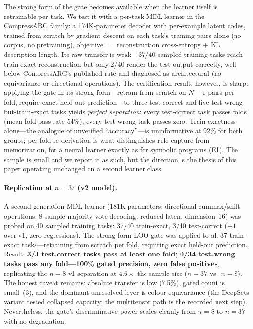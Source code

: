 \documentclass[11pt]{article}
\begin{document}
The strong form of the gate becomes available when the learner itself is
retrainable per task.  We test it with a per-task MDL learner in the
CompressARC family: a 174K-parameter decoder with per-example latent codes,
trained from scratch by gradient descent on each task's training pairs
alone (no corpus, no pretraining), objective $=$ reconstruction
cross-entropy $+$ KL description length.  Its raw transfer is weak---37/40
sampled training tasks reach train-exact reconstruction but only 2/40
render the test output correctly, well below CompressARC's published rate
and diagnosed as architectural (no equivariance or directional operations).
The certification result, however, is sharp: applying the gate in its
strong form---retrain from scratch on $N{-}1$ pairs per fold, require
exact held-out prediction---to three test-correct and five
test-wrong-but-train-exact tasks yields \emph{perfect separation}: every
test-correct task passes folds (mean fold pass rate 54\%), every test-wrong
task passes zero.  Train-exactness alone---the analogue of unverified
``accuracy''---is uninformative at 92\% for both groups; per-fold
re-derivation is what distinguishes rule capture from memorization, for a
neural learner exactly as for symbolic programs (E1).  The sample is small
and we report it as such, but the direction is the thesis of this paper
operating unchanged on a second learner class.

\paragraph{Replication at $n{=}37$ (v2 model).}
A second-generation MDL learner (181K parameters: directional cummax/shift
operations, 8-sample majority-vote decoding, reduced latent dimension~16)
was probed on 40 sampled training tasks: 37/40 train-exact, 3/40
test-correct ($+1$ over v1, zero regressions).  The strong-form LOO gate
was applied to all 37 train-exact tasks---retraining from scratch per fold,
requiring exact held-out prediction.  Result: \textbf{3/3 test-correct
tasks pass at least one fold; 0/34 test-wrong tasks pass any fold---100\%
gated precision, zero false positives}, replicating the $n{=}8$ v1
separation at $4.6\times$ the sample size ($n{=}37$ vs.\ $n{=}8$).  The
honest caveat remains: absolute transfer is low (7.5\%), gated count is
small~(3), and the dominant unresolved lever is colour equivariance (the
DeepSets variant tested collapsed capacity; the multitensor path is the
recorded next step).  Nevertheless, the gate's discriminative power scales
cleanly from $n{=}8$ to $n{=}37$ with no degradation.
\end{document}

